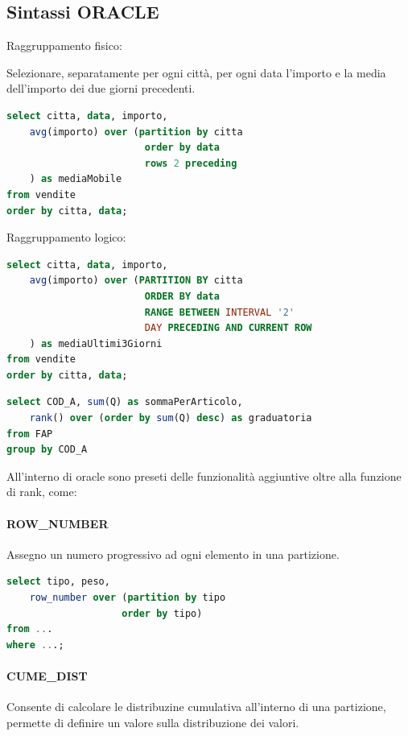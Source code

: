 \documentclass[12pt]{article}
\begin{document}
\subsection{Sintassi ORACLE}
Raggruppamento fisico:
\begin{example}{}{}
    Selezionare, separatamente per ogni citt\`a, per ogni data l'importo e la media dell'importo dei due giorni precedenti.
    \begin{lstlisting}[language=sql]
select citta, data, importo,
    avg(importo) over (partition by citta
                        order by data
                        rows 2 preceding
    ) as mediaMobile
from vendite
order by citta, data;
    \end{lstlisting}
\end{example}


Raggruppamento logico:
\begin{example}{}{}
   \begin{lstlisting}[language=sql]
select citta, data, importo,
    avg(importo) over (PARTITION BY citta
                        ORDER BY data
                        RANGE BETWEEN INTERVAL '2'
                        DAY PRECEDING AND CURRENT ROW
    ) as mediaUltimi3Giorni
from vendite
order by citta, data;
   \end{lstlisting}
\end{example}

\begin{example}{}{}
    \begin{lstlisting}[language=sql]
select COD_A, sum(Q) as sommaPerArticolo,
    rank() over (order by sum(Q) desc) as graduatoria
from FAP
group by COD_A
    \end{lstlisting}
\end{example}


All'interno di oracle sono preseti delle funzionalit\`a aggiuntive oltre alla funzione di rank, come: 

\paragraph{ROW\_NUMBER}
Assegno un numero progressivo ad ogni elemento in una partizione.

\begin{lstlisting}[language=sql]
select tipo, peso,
    row_number over (partition by tipo
                    order by tipo)
from ...
where ...;
\end{lstlisting}

\paragraph{CUME\_DIST}
Consente di calcolare le distribuzine cumulativa all'interno di una partizione, permette di definire un valore sulla distribuzione dei valori.
\end{document}
